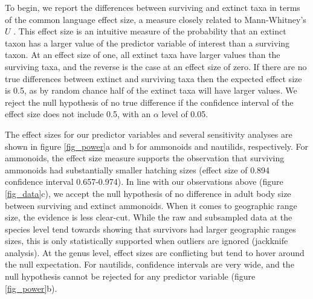 \documentclass[a4paper]{article}
\begin{document}
To begin, we report the differences between surviving and extinct taxa in terms of the common language effect size, a measure closely related to Mann-Whitney's $U$ \parencite{permeConfidenceIntervalsMann2019}. This effect size is an intuitive measure of the probability that an extinct taxon has a larger value of the predictor variable of interest than a surviving taxon. At an effect size of one, all extinct taxa have larger values than the surviving taxa, and the reverse is the case at an effect size of zero. If there are no true differences between extinct and surviving taxa then the expected effect size is 0.5, as by random chance half of the extinct taxa will have larger values. We reject the null hypothesis of no true difference if the confidence interval of the effect size does not include 0.5, with an $\alpha$ level of 0.05. 

The effect sizes for our predictor variables and several sensitivity analyses are shown in figure \ref{fig_power}a and b for ammonoids and nautilids, respectively. 
For ammonoids, the effect size measure supports the observation that surviving ammonoids had substantially smaller hatching sizes (effect size of 0.894 confidence interval 0.657-0.974). 
In line with our observations above (figure \ref{fig_data}c), we accept the null hypothesis of no difference in adult body size between surviving and extinct ammonoids.
When it comes to geographic range size, the evidence is less clear-cut. While the raw and subsampled data at the species level tend towards showing that survivors had larger geographic ranges sizes, this is only statistically supported when outliers are ignored (jackknife analysis). At the genus level, effect sizes are conflicting but tend to hover around the null expectation. 
For nautilids, confidence intervals are very wide, and the null hypothesis cannot be rejected for any predictor variable (figure \ref{fig_power}b). 
\end{document}
